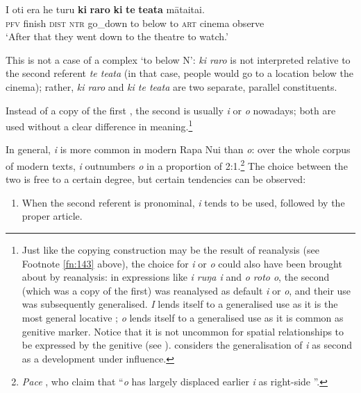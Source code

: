 \ea\label{ex:3.139}
\gll I oti era he turu \textbf{ki} \textbf{raro} \textbf{ki} \textbf{te} \textbf{teata} māta{\ꞌ}ita{\ꞌ}i.\\
\textsc{pfv} finish \textsc{dist} \textsc{ntr} go\_down to below to \textsc{art} cinema observe\\

\glt
‘After that they went down to the theatre to watch.’ \textstyleExampleref{[R210.145]} 
\z

This is not a case of a complex  ‘to below N’: \textit{ki raro} is not interpreted relative to the second referent \textit{te teata} (in that case, people would go to a location below the cinema); rather, \textit{ki raro} and \textit{ki te teata} are two separate, parallel constituents.

Instead of a copy of the first , the second  is usually \textit{i} or \textit{o} nowadays; both are used without a clear difference in meaning.\footnote{\label{fn:145}Just like the copying construction may be the result of reanalysis (see Footnote \ref{fn:143} above), the choice for \textit{i} or \textit{o} could also have been brought about by reanalysis: in expressions like \textit{{\ꞌ}i ruŋa i} and \textit{o roto o}, the second  (which was a copy of the first) was reanalysed as default \textit{i} or \textit{o}, and their use was subsequently generalised. \textit{I} lends itself to a generalised use as it is the most general locative ; \textit{o} lends itself to a generalised use as it is common as genitive marker. Notice that it is not uncommon for spatial relationships to be expressed by the genitive (see \citealt[285]{Dixon2010-2}). \citet[324]{Fischer2001Hispan} considers the generalisation of \textit{i} as second  as a development under  influence.}

In general, \textit{i} is more common in modern Rapa Nui than \textit{o}: over the whole corpus of modern texts, \textit{i} outnumbers \textit{o} in a proportion of 2:1.\footnote{\label{fn:146}\textit{Pace} \citet[28]{FinneyAlexander1998}, who claim that “\textit{o} has largely displaced earlier \textit{i} as right-side ”.} The choice between the two is free to a certain degree, but certain tendencies can be observed:

\begin{enumerate}
\item 
When the second referent is pronominal, \textit{i} tends to be used, followed by the proper article.
\end{enumerate}

